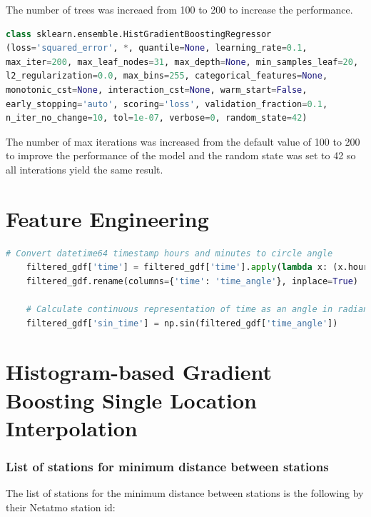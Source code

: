The number of trees was increaed from 100 to 200 to increase the performance.

\begin{lstlisting}[language=Python, caption=Histogram-based Gradient Boosting Parameters]
class sklearn.ensemble.HistGradientBoostingRegressor
(loss='squared_error', *, quantile=None, learning_rate=0.1,
max_iter=200, max_leaf_nodes=31, max_depth=None, min_samples_leaf=20,
l2_regularization=0.0, max_bins=255, categorical_features=None,
monotonic_cst=None, interaction_cst=None, warm_start=False,
early_stopping='auto', scoring='loss', validation_fraction=0.1,
n_iter_no_change=10, tol=1e-07, verbose=0, random_state=42)
\end{lstlisting}

The number of max iterations was increased from the default value of 100 to 200 to improve the performance of the model and the random state was set to 42 so all interations yield the same result.

\section{Feature Engineering}

\begin{lstlisting}[language=Python, caption=Timestamp to Sinus Curve Feature, label=lst: timestamp to sin]
    # Convert datetime64 timestamp hours and minutes to circle angle
    filtered_gdf['time'] = filtered_gdf['time'].apply(lambda x: (x.hour * 60 + x.minute) * 2 * np.pi / (24 * 60))
    filtered_gdf.rename(columns={'time': 'time_angle'}, inplace=True)

    # Calculate continuous representation of time as an angle in radians
    filtered_gdf['sin_time'] = np.sin(filtered_gdf['time_angle'])
\end{lstlisting}

\section{Histogram-based Gradient Boosting Single Location Interpolation}

\subsubsection{List of stations for minimum distance between stations}
\label{appendix stations for minimum distance between stations}

The list of stations for the minimum distance between stations is the following by their Netatmo station id:

